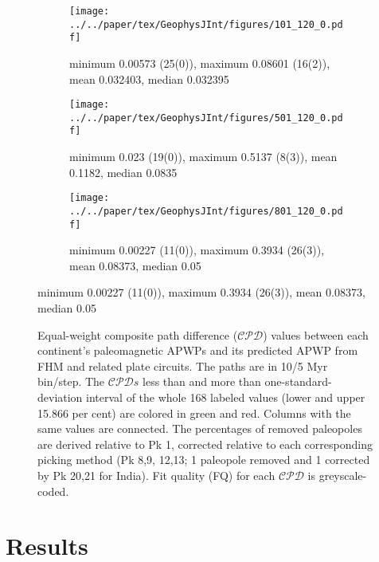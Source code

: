 \begin{figure}[tbp]
  \vspace*{-.1cm}
  \centering
  \begin{subfigure}{.94\textwidth}
    \texttt{[image: ../../paper/tex/GeophysJInt/figures/101\_120\_0.pdf]}
    \caption{minimum 0.00573 (25(0)), maximum 0.08601 (16(2)), mean 0.032403,
      median 0.032395}\label{fig-na-dif} %
  \end{subfigure}
  \vspace{.1em} %
  \begin{subfigure}{.94\textwidth}
    \texttt{[image: ../../paper/tex/GeophysJInt/figures/501\_120\_0.pdf]}
    \caption{minimum 0.023 (19(0)), maximum 0.5137 (8(3)), mean 0.1182, median
      0.0835}\label{fig-in-dif} %
  \end{subfigure}
  \vspace{.1em}
  \begin{subfigure}{.94\textwidth}
    \texttt{[image: ../../paper/tex/GeophysJInt/figures/801\_120\_0.pdf]}
    \caption{minimum 0.00227 (11(0)), maximum 0.3934 (26(3)), mean 0.08373,
      median 0.05}\label{fig-au-dif} %
  \end{subfigure}
\end{figure}
\begin{figure}[!ht]
  \ContinuedFloat\caption[$\mathcal{CPD}$ of each plate's paleomagnetic APWPs vs its FHM
    predicted APWP]{Equal-weight composite path difference ($\mathcal{CPD}$)
    values between each continent's paleomagnetic APWPs and its predicted APWP
    from FHM and related plate circuits. The paths are in 10/5 Myr bin/step. The
    $\mathcal{CPD}s$ less than and more than one-standard-deviation interval of
    the whole 168 labeled values (lower and upper 15.866 per cent) are colored
    in green and red. Columns with the same values are connected. The
    percentages of removed paleopoles are derived relative to Pk 1, corrected
    relative to each corresponding picking method (Pk 8,9, 12,13; 1 paleopole
    removed and 1 corrected by Pk 20,21 for India). Fit quality (FQ) for each
    $\mathcal{CPD}$ is greyscale-coded.}\label{fig-dif} %
\end{figure}

\section{Results}

